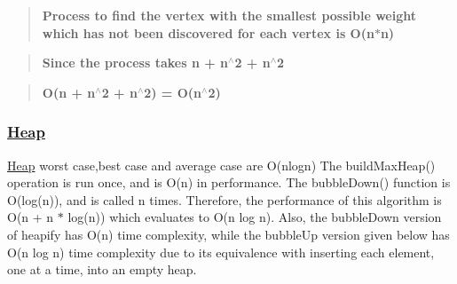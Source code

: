 \begin{quote}
{\bfseries Process to find the vertex with the smallest possible weight which has not been discovered for each vertex is O(n$\ast$n)} \end{quote}


\begin{quote}
{\bfseries Since the process takes n + n$^\wedge$2 + n$^\wedge$2} \end{quote}


\begin{quote}
{\bfseries O(n + n$^\wedge$2 + n$^\wedge$2) = O(n$^\wedge$2)} \end{quote}


\subsubsection*{\hyperlink{class_heap}{Heap}}

\hyperlink{class_heap}{Heap} worst case,best case and average case are O(nlogn) The build\+Max\+Heap() operation is run once, and is O(n) in performance. The bubble\+Down() function is O(log(n)), and is called n times. Therefore, the performance of this algorithm is O(n + n $\ast$ log(n)) which evaluates to O(n log n). Also, the bubble\+Down version of heapify has O(n) time complexity, while the bubble\+Up version given below has O(n log n) time complexity due to its equivalence with inserting each element, one at a time, into an empty heap. 